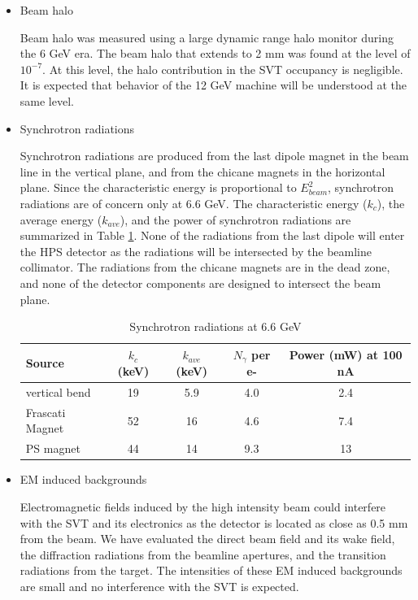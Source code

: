 \begin{itemize}
\item
Beam halo

Beam halo was measured using a large dynamic range halo monitor during the 6 GeV era. The beam halo 
that extends to 2 mm was found at the level of $10^{-7}$. At this level, the halo contribution in 
the SVT occupancy is negligible. It is expected that behavior of the 12 GeV machine will be
understood at the same level.

\item
Synchrotron radiations

Synchrotron radiations are produced from the last dipole magnet in the beam line in the vertical 
plane, and from the chicane magnets in the horizontal plane. Since the characteristic energy is 
proportional to $E_{beam}^2$, synchrotron radiations are of concern 
only at 6.6 GeV. The characteristic energy ($k_c$),
the average energy ($k_{ave}$), and the power of synchrotron radiations are summarized in 
Table \ref{tab:sync}.
None of the radiations from the last dipole will enter the HPS detector as the radiations will be intersected 
by the beamline collimator. The radiations from the chicane magnets are in the dead zone, and
none of the detector components are designed to intersect the beam plane.   

\begin{table}[h]
\begin{center}
\begin{tabular}{|l|c|c|c|c|} \hline
  Source & $k_c$ (keV) & $k_{ave}$ (keV) & $N_\gamma$ per e- & Power (mW) at 100 nA \\ \hline
  vertical bend & 19 & 5.9 & 4.0 & 2.4 \\ \hline
  Frascati Magnet & 52 & 16 & 4.6 & 7.4 \\ \hline
  PS magnet   & 44 & 14 & 9.3 & 13 \\ \hline
\end{tabular}
\end{center}
\caption{\small{Synchrotron radiations at 6.6 GeV}}
\label{tab:sync}
\end{table}


\item
EM induced backgrounds

Electromagnetic fields induced by the high intensity beam could interfere with the SVT and its electronics
as the detector is located as close as 0.5 mm from the beam. We have evaluated the direct beam field and its wake 
field, the diffraction radiations from the beamline apertures, and the transition radiations from
the target. The intensities of these EM induced backgrounds are small and no interference with the SVT
is expected.
 
\end{itemize}

